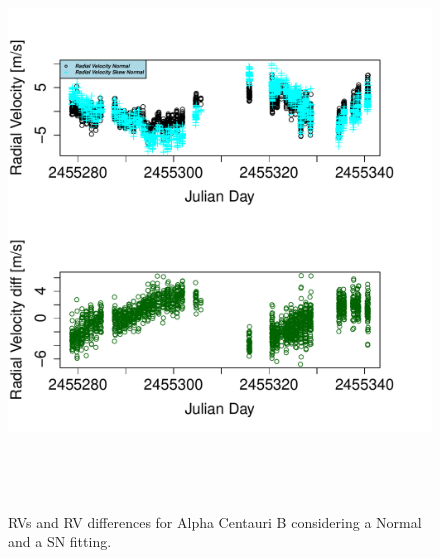 \documentclass[11pt, oneside]{article}
\begin{document}
\begin{figure}[htbp]
   \centering
\includegraphics[height = 6in]{HD12862_[2]RadialVelocityDifferences.pdf} 
   \caption{RVs and RV differences for Alpha Centauri B considering a Normal and a SN fitting.}
   \label{fig:alphacent:diff:RV}
\end{figure}
\end{document}
